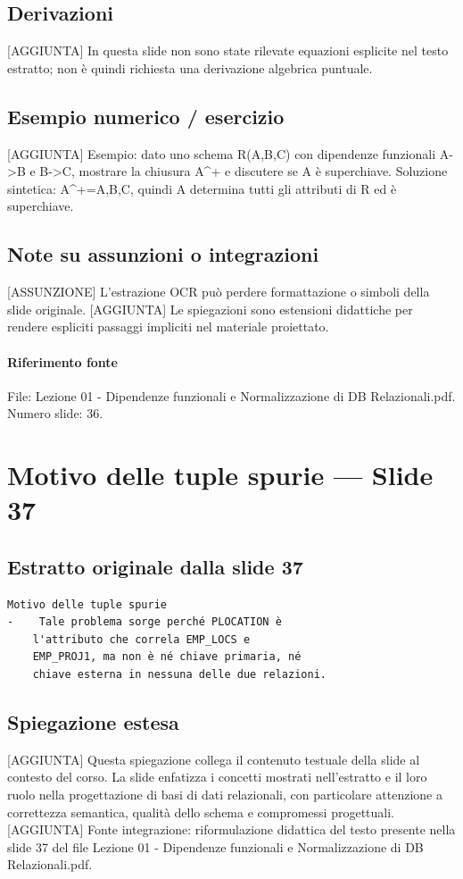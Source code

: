 \documentclass[11pt]{article}
\begin{document}
\subsection*{Derivazioni}
[AGGIUNTA] In questa slide non sono state rilevate equazioni esplicite nel testo estratto; non è quindi richiesta una derivazione algebrica puntuale.
\subsection*{Esempio numerico / esercizio}
[AGGIUNTA] Esempio: dato uno schema R(A,B,C) con dipendenze funzionali A->B e B->C, mostrare la chiusura A^+ e discutere se A è superchiave. Soluzione sintetica: A^+={A,B,C}, quindi A determina tutti gli attributi di R ed è superchiave.
\subsection*{Note su assunzioni o integrazioni}
[ASSUNZIONE] L'estrazione OCR può perdere formattazione o simboli della slide originale.
[AGGIUNTA] Le spiegazioni sono estensioni didattiche per rendere espliciti passaggi impliciti nel materiale proiettato.
\paragraph{Riferimento fonte} File: Lezione 01 - Dipendenze funzionali e Normalizzazione di DB Relazionali.pdf. Numero slide: 36.
\section{Motivo delle tuple spurie --- Slide 37}
\subsection*{Estratto originale dalla slide 37}
\begin{lstlisting}
Motivo delle tuple spurie
-    Tale problema sorge perché PLOCATION è
    l'attributo che correla EMP_LOCS e
    EMP_PROJ1, ma non è né chiave primaria, né
    chiave esterna in nessuna delle due relazioni.
\end{lstlisting}
\subsection*{Spiegazione estesa}
[AGGIUNTA] Questa spiegazione collega il contenuto testuale della slide al contesto del corso. La slide enfatizza i concetti mostrati nell'estratto e il loro ruolo nella progettazione di basi di dati relazionali, con particolare attenzione a correttezza semantica, qualità dello schema e compromessi progettuali.
[AGGIUNTA] Fonte integrazione: riformulazione didattica del testo presente nella slide 37 del file Lezione 01 - Dipendenze funzionali e Normalizzazione di DB Relazionali.pdf.
\end{document}
